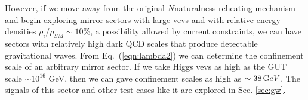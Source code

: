\documentclass[nofootinbib,twocolumn,preprintnumbers]{revtex4-1}
\begin{document}
However, if we move away from the original $N$naturalness reheating mechanism and begin exploring mirror sectors with large vevs and with relative energy densities $\rho_i / \rho_{SM} \sim 10\%$, a possibility allowed by current constraints, we can have sectors with relatively high dark QCD scales that produce detectable gravitational waves. From Eq.~(\ref{eqn:lambda2}) we can determine the confinement scale of an arbitrary mirror sector. If we take Higgs vevs as high as the GUT scale $\sim 10^{16}$ GeV, then we can gave confinement scales as high as $\sim 38 \,{\mathrm GeV}$.  The signals of this sector and other test cases like it are explored in Sec. \ref{sec:gw}. 
\end{document}
